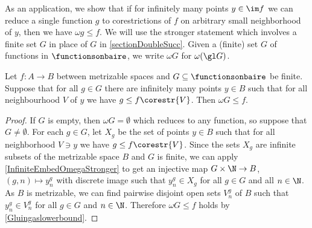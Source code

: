 As an application, we show that if for infinitely many points $y\in \im f$ we can reduce a single function $g$ to corestrictions of $f$ on arbitrary small neighborhood of $y$, then we have $\omega g \leq f$. We will use the stronger statement which involves a finite set $G$ in place of $G$ in \cref{sectionDoubleSucc}.
Given a (finite) set $G$ of functions in $\functionsonbaire$, we write $\omega G$ for $\omega(\gl G)$.

\begin{lemma}\label{Intertwinereductions}
Let $f:A\to B$ between metrizable spaces and $G\subseteq\functionsonbaire$ be finite.
Suppose that for all $g\in G$ there are infinitely many points $y\in B$ such that for all neighbourhood $V$ of $y$ we have $g\leq f\corestr{V}$.
Then $\omega G \leq f$.
\end{lemma}
\begin{proof}
If $G$ is empty, then $\omega G=\emptyset$ which reduces to any function, so suppose that $G\neq\emptyset$. 
For each $g\in G$, let $X_g$ be the set of points $y\in B$ such that for all neighborhood $V\ni y$ we have $g\leq f\corestr{V}$. %
Since the sets $X_g$ are infinite subsets of the metrizable space $B$ and $G$ is finite, we can apply \cref{InfiniteEmbedOmegaStronger} to get an injective map $G\times \N\to B$, $(g,n)\mapsto y^g_n$ with discrete image such that  $y^g_n\in X_g$ for all $g\in G$ and all $n\in \N$. As $B$ is metrizable, we can find pairwise disjoint open sets $V^g_n$ of $B$ such that $y^g_n\in V^g_n$ for all $g\in G$ and $n\in\N$. Therefore $\omega G \leq f$ holds by \cref{Gluingaslowerbound}.
\end{proof}

